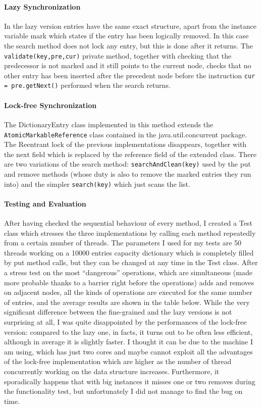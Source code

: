 \documentclass[a4paper]{article}
\begin{document}
\paragraph{Lazy Synchronization}
In the lazy version entries have the same exact structure, apart from the instance variable mark which states if the entry has been logically removed. In this case the search method does not lock any entry, but this is done after it returns. The \texttt{validate(key,pre,cur)} private method, together with checking that the predecessor is not marked and it still points to the current node, checks that no other entry has been inserted after the precedent node before the instruction \texttt{cur =  pre.getNext()} performed when the search returns.

\paragraph{Lock-free Synchronization}
The DictionaryEntry class implemented in this method extends the \texttt{AtomicMarkableReference} class contained in the java.util.concurrent package. The Reentrant lock of the previous implementations disappears, together with the next field which is replaced by the reference field of the extended class. There are two variations of the search method: \texttt{searchAndClean(key)} used by the put and remove methods (whose duty is also to remove the marked entries they run into) and the simpler \texttt{search(key)} which just scans the list.

\paragraph{Testing and Evaluation}
After having checked the sequential behaviour of every method, I created a Test class which stresses the three implementations by calling each method repeatedly from a certain number of threads. The parameters I used for my tests are 50 threads working on a 10000 entries capacity dictionary which is completely filled by put method calls, but they can be changed at any time in the Test class. After a stress test on the most ``dangerous'' operations, which are simultaneous (made more probable thanks to a barrier right before the operations) adds and removes on adjacent nodes, all the kinds of operations are executed for the same number of entries, and the average results are shown in the table below. While the very significant difference between the fine-grained and the lazy versions is not surprising at all, I was quite disappointed by the performances of the lock-free version: compared to the lazy one, in facts, it turns out to be often less efficient, although in average it is slightly faster. I thought it can be due to the machine I am using, which has just two cores and maybe cannot exploit all the advantages of the lock-free implementation which are higher as the number of thread concurrently working on the data structure increases. Furthermore, it sporadically happens that with big instances it misses one or two removes during the functionality test, but unfortunately I did not manage to find the bug on time.
\end{document}
